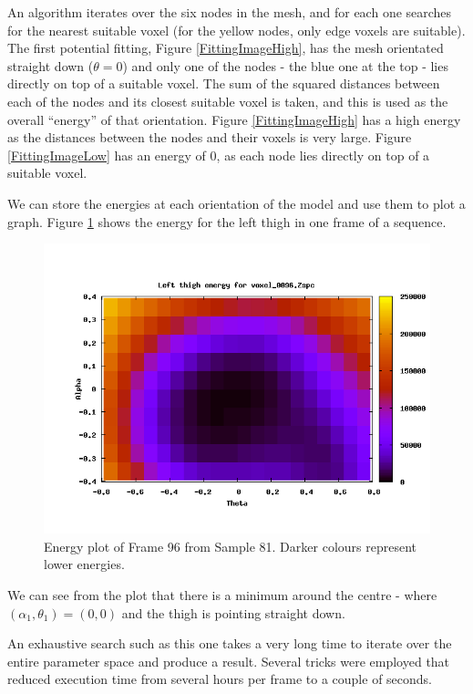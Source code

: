 \documentclass[a4paper,12pt]{article}
\begin{document}
An algorithm iterates over the six nodes in the mesh, and for each one searches for the nearest suitable voxel (for the yellow nodes, only edge voxels are suitable).
The first potential fitting, Figure \ref{FittingImageHigh}, has the mesh orientated straight down ($\theta = 0$) and only one of the nodes - the blue one at the top - lies directly on top of a suitable voxel.
The sum of the squared distances between each of the nodes and its closest suitable voxel is taken, and this is used as the overall ``energy'' of that orientation.
Figure \ref{FittingImageHigh} has a high energy as the distances between the nodes and their voxels is very large.
Figure \ref{FittingImageLow} has an energy of $0$, as each node lies directly on top of a suitable voxel.

We can store the energies at each orientation of the model and use them to plot a graph.
Figure \ref{EnergyPlot} shows the energy for the left thigh in one frame of a sequence.

\begin{figure}[bt]
	\centering
	\includegraphics[width=\textwidth]{../report/problems/set81frame96-fixed-leftthigh.png}
	\caption{Energy plot of Frame 96 from Sample 81.
		Darker colours represent lower energies.}
	\label{EnergyPlot}
\end{figure}

We can see from the plot that there is a minimum around the centre - where $(\alpha_1, \theta_1) = (0, 0)$ and the thigh is pointing straight down.

\bigskip
An exhaustive search such as this one takes a very long time to iterate over the entire parameter space and produce a result.
Several tricks were employed that reduced execution time from several hours per frame to a couple of seconds.
\end{document}
